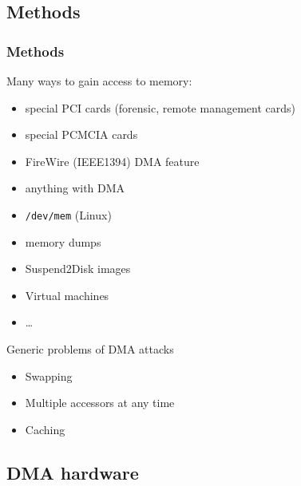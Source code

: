 \documentclass{beamer}
\newenvironment{itemizeframe}[1]
  {\begin{frame}{#1}\startitemizeframe}
  {\stopitemizeframe\end{frame}}
\newcommand\startitemizeframe{\begin{itemize}}
\newcommand\stopitemizeframe{\end{itemize}}
\begin{document}
	\subsection{Methods}

		\begin{frame} \frametitle{Methods}
			Many ways to gain access to memory:
			\begin{itemize}
				\item special PCI cards (forensic, remote management cards)
				\item special PCMCIA cards
				\item FireWire (IEEE1394) DMA feature
				\item anything with DMA
				\item \texttt{/dev/mem} (Linux)
				\item memory dumps
				\item Suspend2Disk images
				\item Virtual machines
				\item \ldots
			\end{itemize}
		\end{frame}

		\begin{itemizeframe}{Generic problems of DMA attacks}
			\item Swapping
			\item Multiple accessors at any time
			\item Caching
		\end{itemizeframe}

	\subsection{DMA hardware}

\end{document}
